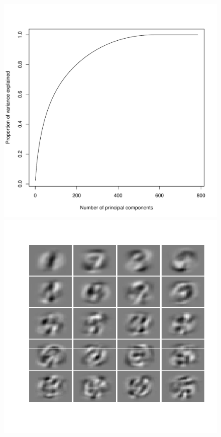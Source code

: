 \documentclass{article}
\begin{document}
\begin{figure}\centering
	\includegraphics[scale=0.4]{pcavar}
	\includegraphics[scale=0.4]{pcanums}
	\caption{}\label{fig:pcavar}
\end{figure}
\end{document}
